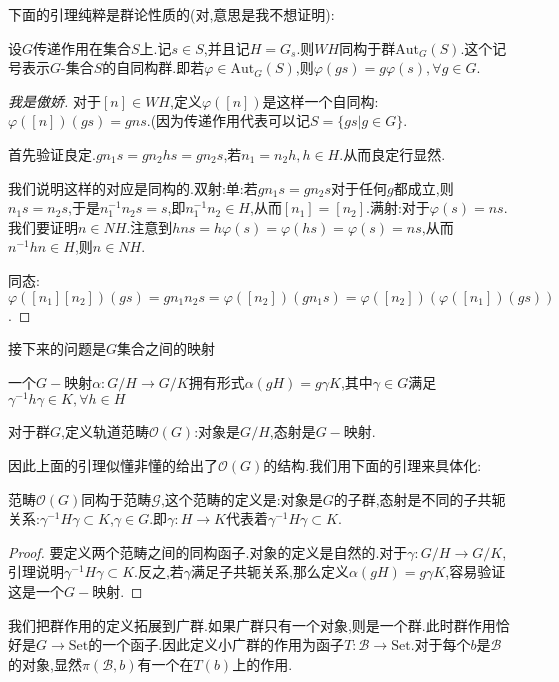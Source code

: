 下面的引理纯粹是群论性质的(对,意思是我不想证明):
\begin{lemma}
    设$G$传递作用在集合$S$上.记$s \in S$,并且记$H=G_s$.则$WH$同构于群$\mathrm{Aut}_G(S)$.这个记号表示$G$-集合$S$的自同构群.即若$\varphi \in \mathrm{Aut}_G(S)$,则$\varphi(gs)=g\varphi(s),\forall g \in G $.
\end{lemma}
\begin{proof}[我是傲娇]
    对于$[n] \in WH$,定义$\varphi([n])$是这样一个自同构:$\varphi([n])(gs)=gns$.(因为传递作用代表可以记$S=\{gs|g\in G\}$.

    首先验证良定.$gn_1s=gn_2hs=gn_2s$,若$n_1=n_2h,h\in H$.从而良定行显然.

    我们说明这样的对应是同构的.双射:单:若$gn_1s=gn_2s$对于任何$g$都成立,则$n_1s=n_2s$,于是$n_1^{-1}n_2s=s$,即$n_1^{-1}n_2 \in H$,从而$[n_1]=[n_2]$.满射:对于$\varphi(s)=ns$.我们要证明$n \in NH$.注意到$hns=h\varphi(s)=\varphi(hs)=\varphi(s)=ns$,从而$n^{-1}hn\in H$,则$n \in NH$.

    同态:$\varphi([n_1][n_2])(gs)=gn_1n_2s=\varphi([n_2])(gn_1s)=\varphi([n_2])(\varphi([n_1])(gs))$.
\end{proof}

接下来的问题是$G$集合之间的映射
\begin{lemma}
    一个$G-$映射$\alpha:G/H \to G/K$拥有形式$\alpha(gH)=g\gamma K$,其中$\gamma \in G$满足$\gamma^{-1}h \gamma \in K, \forall h \in H$
\end{lemma}
\begin{definition}
    对于群$G$,定义轨道范畴$\mathcal{O}(G)$:对象是$G/H$,态射是$G-$映射.
\end{definition}

因此上面的引理似懂非懂的给出了$\mathcal{O}(G)$的结构.我们用下面的引理来具体化:
\begin{lemma}
    范畴$\mathcal{O}(G)$同构于范畴$\mathcal{G}$,这个范畴的定义是:对象是$G$的子群,态射是不同的子共轭关系:$\gamma^{-1} H \gamma \subset K$,$\gamma \in G$.即$\gamma:H \to K$代表着$\gamma^{-1} H \gamma \subset K$.
\end{lemma}
\begin{proof}
    要定义两个范畴之间的同构函子.对象的定义是自然的.对于$\gamma:G/H \to G/K$,引理说明$\gamma^{-1} H \gamma \subset K$.反之,若$\gamma$满足子共轭关系,那么定义$\alpha(gH)=g\gamma K$,容易验证这是一个$G-$映射.
\end{proof}

我们把群作用的定义拓展到广群.如果广群只有一个对象,则是一个群.此时群作用恰好是$G \to \mathrm{Set}$的一个函子.因此定义小广群的作用为函子$T:\mathcal{B}\to \mathrm{Set}$.对于每个$b$是$\mathcal{B}$的对象,显然$\pi(\mathcal{B},b)$有一个在$T(b)$上的作用.

